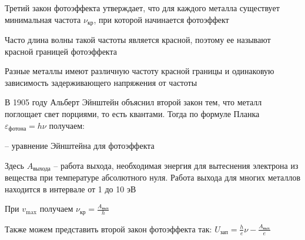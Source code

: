 Третий закон фотоэффекта утверждает, что для каждого металла существует минимальная частота $\nu_{\text{кр}}$, при которой начинается фотоэффект

Часто длина волны такой частоты является красной, поэтому ее называют красной границей фотоэффекта

Разные металлы имеют различную частоту красной границы и одинаковую зависимость задерживающего напряжения от частоты

\mediumvspace

В 1905 году Альберт Эйнштейн объяснил второй закон тем, что металл поглощает свет порциями, то есть квантами. Тогда по формуле Планка $\varepsilon_{\text{фотона}} = h \nu$ получаем:

 -- уравнение Эйнштейна для фотоэффекта

\smallvspace

Здесь $A_{\text{выхода}}$ -- работа выхода, необходимая энергия для вытеснения электрона из вещества при температуре абсолютного нуля. Работа выхода для многих металлов находится в интервале от 1 до 10 эВ

При $v_{\max}$ получаем $\nu_\text{кр} = \frac{A_\text{вых}}{h}$

Также можем представить второй закон фотоэффекта так: $U_\text{зап} = \frac{h}{e} \nu - \frac{A_\text{вых}}{e}$
